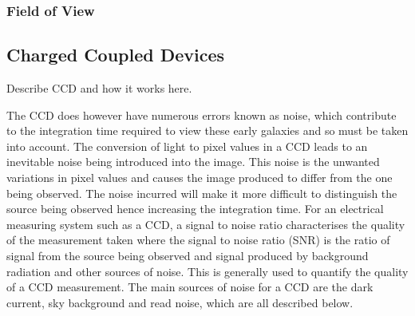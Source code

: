 		\subsubsection{Field of View}

	\subsection{Charged Coupled Devices} %
	\label{sub:charged_coupled_devices}
		Describe CCD and how it works here.

		The CCD does however have numerous errors known as noise, which contribute to the integration time required to view these early galaxies and so must be taken into account. The conversion of light to pixel values in a CCD leads to an inevitable noise being introduced into the image. This noise is the unwanted variations in pixel values and causes the image produced to differ from the one being observed. The noise incurred will make it more difficult to distinguish the source being observed hence increasing the integration time. For an electrical measuring system such as a CCD, a signal to noise ratio characterises the quality of the measurement taken where the signal to noise ratio (SNR) is the ratio of signal from the source being observed and signal produced by background radiation and other sources of noise. This is generally used to quantify the quality of a CCD measurement. The main sources of noise for a CCD are the dark current, sky background and read noise, which are all described below.

